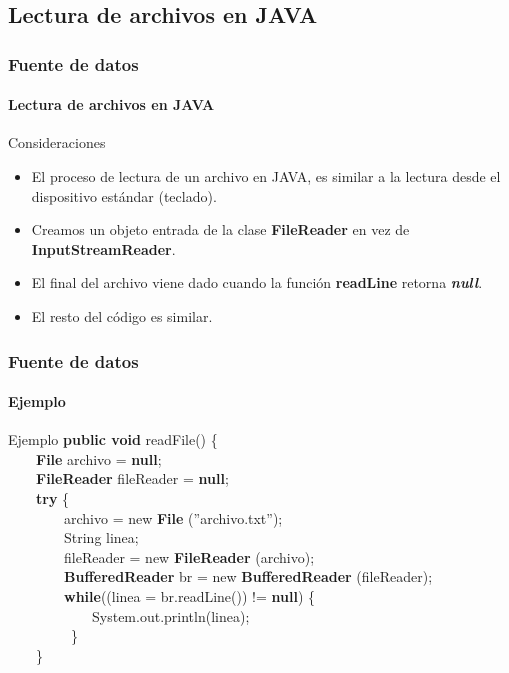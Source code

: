 \documentclass{beamer}
\begin{document}
		\subsection{Lectura de archivos en JAVA}

		\begin{frame}
			\frametitle{Fuente de datos}
			\framesubtitle{Lectura de archivos en JAVA}

			\begin{block}{Consideraciones}
				\begin{itemize}
					\item El proceso de lectura de un archivo en JAVA, es similar a la lectura desde el dispositivo est\'andar (teclado).
					\item Creamos un objeto entrada de la clase \textbf{FileReader} en vez de \textbf{InputStreamReader}.
					\item El final del archivo viene dado cuando la funci\'on \textbf{readLine} retorna \textbf{{\em null}}.
					\item El resto del c\'odigo es similar.
				\end{itemize}
			\end{block}
		\end{frame}

		\begin{frame}
			\frametitle{Fuente de datos}
			\framesubtitle{Ejemplo}

			\begin{block}{Ejemplo}
			{\scriptsize
				\textbf{public void} readFile() \{ \\
				\ \ \ \ \textbf{File} archivo = \textbf{null}; \\
			         \ \ \ \ \textbf{FileReader} fileReader = \textbf{null};\\
				\ \ \ \ \textbf{try} \{ \\
                       		\ \ \ \ \ \ \ \ archivo = new \textbf{File} (''archivo.txt''); \\
				\ \ \ \ \ \ \ \ String linea; \\
				\ \ \ \ \ \ \ \ fileReader = new \textbf{FileReader} (archivo); \\
				\ \ \ \ \ \ \ \ \textbf{BufferedReader} br = new \textbf{BufferedReader} (fileReader); \\
				\ \ \ \ \ \ \ \ \textbf{while}((linea = br.readLine()) != \textbf{null}) \{ \\
				\ \ \ \ \ \ \ \ \ \ \ \ System.out.println(linea); \\
				\ \ \ \ \ \ \ \ \ \} \\
				\ \ \ \ \} \\
			}
			\end{block}
		\end{frame}
\end{document}
